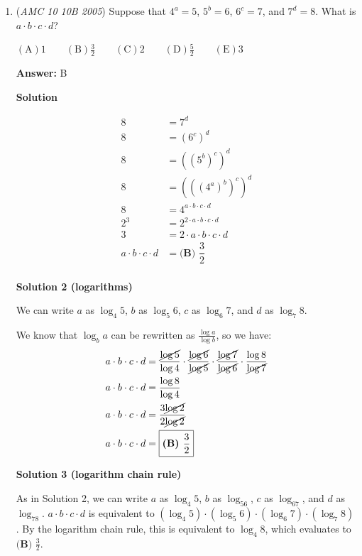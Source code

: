 \begin{enumerate}
	\item (\textit{AMC 10 10B 2005}) Suppose that $4^a = 5$, $5^b = 6$, $6^c = 7$, and $7^d = 8$. What is $a \cdot b \cdot c \cdot d$?


 $\mathrm{(A)} 1 \qquad \mathrm{(B)} \frac{3}{2} \qquad \mathrm{(C)} 2 \qquad \mathrm{(D)} \frac{5}{2} \qquad \mathrm{(E)} 3$

 \textbf{Answer: }B



\textbf{Solution}


 \begin{align*} 8&=7^d \\ 8&=\left(6^c\right)^d\\ 8&=\left(\left(5^b\right)^c\right)^d\\ 8&=\left(\left(\left(4^a\right)^b\right)^c\right)^d\\ 8&=4^{a\cdot b\cdot c\cdot d}\\ 2^3&=2^{2\cdot a\cdot b\cdot c\cdot d}\\ 3&=2\cdot a\cdot b\cdot c\cdot d\\ a\cdot b\cdot c\cdot d&=\boxed{\textbf{(B) }\dfrac{3}{2}}\\ \end{align*}





\textbf{Solution 2 (logarithms)}

We can write $a$ as $\log_4 5$, $b$ as $\log_5 6$, $c$ as $\log_6 7$, and $d$ as $\log_7 8$. 

 We know that $\log_b a$ can be rewritten as $\frac{\log a}{\log b}$, so we have:
 \begin{align*} a\cdot b \cdot c \cdot d &= \frac{\cancel{\log5}}{\log4}\cdot\frac{\cancel{\log6}}{\cancel{\log5}}\cdot\frac{\cancel{\log7}}{\cancel{\log6}}\cdot\frac{\log8}{\cancel{\log7}} \\ a\cdot b \cdot c \cdot d &= \frac{\log8}{\log4} \\ a\cdot b \cdot c \cdot d &= \frac{3\cancel{\log2}}{2\cancel{\log2}} \\ a\cdot b \cdot c \cdot d &= \boxed{\textbf{(B) }\frac{3}{2}} \\ \end{align*}





\textbf{Solution 3 (logarithm chain rule)}

As in Solution 2, we can write $a$ as $\log_4 5$, $b$ as $\log_56$, $c$ as $\log_67$, and $d$ as $\log_78$. $a\cdot b\cdot c\cdot d$ is equivalent to $(\log_4 5)\cdot (\log_5 6)\cdot (\log_6 7)\cdot (\log_7 8)$. By the logarithm chain rule, this is equivalent to $\log_4 8$, which evaluates to $\boxed{\textbf{(B) }\frac{3}{2}}$.


\end{enumerate}
